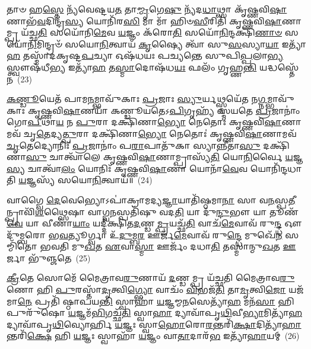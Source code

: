 𑌤𑌾𑍞 𑌹\-\ul{𑌸𑍍𑌤𑍇} 𑌨𑍍𑌯᳴𑌵𑍇𑌷𑍍𑌟𑌯\-\ul{𑌤} 𑌤𑌾\-\ul{𑌮𑍍𑌮𑍃}\-𑌗𑍇\-\ul{𑌷𑍁} 𑌨𑍍𑌯᳴𑌦\-\ul{𑌧𑌾}\-𑌥𑍍𑌸𑌾 𑌕𑍃᳴𑌷𑍍𑌣𑌵𑌿\-\ul{𑌷𑌾}\-𑌣𑌾𑌭᳴\-\ul{𑌵}\-𑌦𑌿𑌨𑍍𑌦𑍍𑌰᳴\-\ul{𑌸𑍍𑌯} 𑌯𑍋𑌨𑌿᳴𑌰\-\ul{𑌸𑌿} 𑌮𑌾 𑌮𑌾᳴ 𑌹𑌿𑍞\-\ul{𑌸𑍀}\-𑌰𑌿𑌤𑌿᳴ 𑌕𑍃𑌷𑍍𑌣𑌵𑌿\-\ul{𑌷𑌾}\-𑌣𑌾𑌮𑍍𑌪𑍍𑌰 𑌯᳴𑌚𑍍𑌛\-\ul{𑌤𑌿} 𑌸𑌯𑍋᳴𑌨𑌿\-\ul{𑌮𑍇}\-𑌵 \ul{𑌯}\-𑌜𑍍𑌞𑌂 𑌕᳴𑌰𑍋\-\ul{𑌤𑌿} 𑌸𑌯𑍋᳴\-\ul{𑌨𑌿}\-𑌨𑍍𑌦𑌕𑍍𑌷𑌿᳴\-\ul{𑌣𑌾}\-\-\ul{𑍞} 𑌸𑌯𑍋᳴\-\ul{𑌨𑌿}\-𑌮𑌿𑌨𑍍𑌦𑍍𑌰𑍞᳴ 𑌸𑌯𑍋\-\ul{𑌨𑌿}\-𑌤𑍍𑌵𑌾𑌯᳴ \ul{𑌕𑍃}\-𑌷𑍍𑌯𑍈 𑌤𑍍𑌵𑌾᳴ 𑌸𑍁\-\ul{𑌸}\-𑌸𑍍𑌯𑌾\-\ul{𑌯𑌾} 𑌇𑌤𑍍𑌯𑌾᳴\-\ul{𑌹} 𑌤𑌸𑍍𑌮𑌾᳴𑌦𑌕𑍃𑌷𑍍𑌟\-\ul{𑌪}\-𑌚𑍍𑌯𑌾 𑌓𑌷᳴𑌧𑌯𑌃 𑌪𑌚𑍍𑌯𑌨𑍍𑌤𑍇 𑌸𑍁𑌪𑌿\-\ul{𑌪𑍍𑌪}\-𑌲𑌾\-\ul{𑌭𑍍𑌯}\-𑌸𑍍𑌤𑍍𑌵𑍗𑌷᳴𑌧𑍀\-\ul{𑌭𑍍𑌯} 𑌇𑌤𑍍𑌯𑌾᳴\-\ul{𑌹} 𑌤\-\ul{𑌸𑍍𑌮𑌾}\-𑌦𑍋𑌷᳴𑌧\-\ul{𑌯𑌃} 𑌫𑌲𑌂᳴ 𑌗𑍃𑌹𑍍𑌣\-\ul{𑌨𑍍𑌤𑌿} 𑌯𑌦𑍍𑌧𑌸𑍍𑌤𑍇᳴𑌨~(23)

\-\ul{𑌕}\-\-\ul{𑌣𑍍𑌡𑍂}\-𑌯𑍇𑌤᳴ 𑌪𑌾𑌮\-\ul{𑌨}\-𑌮𑍍𑌭𑌾𑌵𑍁᳴𑌕𑌾𑌃 \ul{𑌪𑍍𑌰}\-𑌜𑌾𑌃 \ul{𑌸𑍍𑌯𑍁}\-𑌰𑍍𑌯𑌥𑍍𑌸𑍍𑌮𑌯𑍇᳴𑌤 𑌨\-\ul{𑌗𑍍𑌨}\-𑌮𑍍𑌭𑌾𑌵𑍁᳴𑌕𑌾𑌃 𑌕𑍃𑌷𑍍𑌣𑌵𑌿\-\ul{𑌷𑌾}\-𑌣𑌯𑌾᳴ 𑌕𑌣𑍍𑌡𑍂𑌯𑌤𑍇\-𑌽\-\ul{𑌪𑌿}\-𑌗𑍃𑌹𑍍𑌯᳴ 𑌸𑍍𑌮𑌯𑌤𑍇 \ul{𑌪𑍍𑌰}\-𑌜𑌾𑌨𑌾𑌂॑ 𑌗𑍋\-\ul{𑌪𑍀}\-𑌥𑌾\-\ul{𑌯} 𑌨 \ul{𑌪𑍁}\-𑌰𑌾 𑌦𑌕𑍍𑌷𑌿᳴𑌣𑌾\-\ul{𑌭𑍍𑌯𑍋} 𑌨𑍇𑌤𑍋𑌃॑ 𑌕𑍃𑌷𑍍𑌣𑌵𑌿\-\ul{𑌷𑌾}\-𑌣𑌾𑌮𑌵᳴ 𑌚𑍃\-\ul{𑌤𑍇}\-𑌦𑍍𑌯\-\ul{𑌤𑍍𑌪𑍁}\-𑌰𑌾 𑌦𑌕𑍍𑌷𑌿᳴𑌣𑌾\-\ul{𑌭𑍍𑌯𑍋} 𑌨𑍇𑌤𑍋𑌃॑ 𑌕𑍃𑌷𑍍𑌣𑌵𑌿\-\ul{𑌷𑌾}\-𑌣𑌾𑌮𑌵᳴\-\ul{𑌚𑍃}\-𑌤𑍇𑌦𑍍𑌯𑍋𑌨𑌿𑌃᳴ \ul{𑌪𑍍𑌰}\-𑌜𑌾𑌨𑌾𑌂॑ 𑌪\-\ul{𑌰𑌾}\-𑌪𑌾𑌤𑍁᳴𑌕𑌾 𑌸𑍍𑌯𑌾\-\ul{𑌨𑍍𑌨𑍀}\-𑌤𑌾\-\ul{𑌸𑍁} 𑌦𑌕𑍍𑌷𑌿᳴𑌣𑌾\-\ul{𑌸𑍁} 𑌚𑌾𑌤𑍍𑌵𑌾᳴𑌲𑍇 𑌕𑍃𑌷𑍍𑌣𑌵𑌿\-\ul{𑌷𑌾}\-𑌣𑌾𑌮𑍍𑌪𑍍𑌰𑌾𑌸𑍍𑌯᳴\-\ul{𑌤𑌿} 𑌯𑍋\-\ul{𑌨𑌿}\-𑌰𑍍𑌵𑍈 \ul{𑌯}\-𑌜𑍍𑌞\-\ul{𑌸𑍍𑌯} 𑌚𑌾𑌤𑍍𑌵𑌾᳴\-\ul{𑌲𑌂} 𑌯𑍋𑌨𑌿𑌃᳴ 𑌕𑍃𑌷𑍍𑌣𑌵𑌿\-\ul{𑌷𑌾}\-𑌣𑌾 𑌯𑍋𑌨𑌾᳴\-\ul{𑌵𑍇}\-𑌵 𑌯𑍋𑌨𑌿᳴𑌨𑍍𑌦𑌧𑌾𑌤𑌿 \ul{𑌯}\-𑌜𑍍𑌞𑌸𑍍𑌯᳴ 𑌸𑌯𑍋\-\ul{𑌨𑌿}\-𑌤𑍍𑌵𑌾𑌯᳴॥~(24)

{\anuvakamend[{\-\ul{𑌰𑍁}\-\-\ul{𑌨𑍍𑌧} \ul{𑌏}\-𑌷 𑌤𑌸𑍍𑌮𑌾॑𑌚𑍍𑌛\-\ul{𑌰}\-𑌮\-\ul{𑌯𑍀} 𑌯𑍂\-\ul{𑌪}\-𑌸𑍍𑌤𑍃𑌤𑍀᳴𑌯𑌮𑍍𑌮𑌿𑌥𑍁\-\ul{𑌨}\-𑌤𑍍𑌵𑌾\-\ul{𑌯} 𑌜\-\ul{𑌨𑍍𑌮} 𑌹𑌸𑍍𑌤𑍇᳴\-\ul{𑌨𑌾}\-𑌷𑍍𑌟𑌾𑌚᳴𑌤𑍍𑌵𑌾𑌰𑌿𑍞𑌶𑌚𑍍𑌚}]}%

𑌵𑌾𑌗𑍍𑌵𑍈 \ul{𑌦𑍇}\-𑌵𑍇𑌭𑍍𑌯𑍋\-𑌽𑌪𑌾॑𑌕𑍍𑌰𑌾𑌮𑌦𑍍𑌯\-\ul{𑌜𑍍𑌞𑌾}\-𑌯𑌾𑌤𑌿᳴𑌷𑍍𑌠𑌮𑌾\-\ul{𑌨𑌾} 𑌸𑌾 𑌵\-\ul{𑌨}\-𑌸𑍍𑌪\-\ul{𑌤𑍀}\-𑌨𑍍𑌪𑍍𑌰𑌾𑌵𑌿᳴\-\ul{𑌶}\-𑌥𑍍𑌸𑍈𑌷𑌾 𑌵𑌾𑌗𑍍𑌵\-\ul{𑌨}\-𑌸𑍍𑌪𑌤𑌿᳴𑌷𑍁 𑌵𑌦\-\ul{𑌤𑌿} 𑌯𑌾 𑌦𑍁᳴\-\ul{𑌨𑍍𑌦𑍁}\-𑌭𑍗 𑌯𑌾 𑌤𑍂𑌣᳴\-\ul{𑌵𑍇} 𑌯𑌾 𑌵𑍀𑌣𑌾᳴\-\ul{𑌯𑌾𑌂} 𑌯𑌦𑍍𑌦𑍀॑𑌕𑍍𑌷𑌿𑌤\-\ul{𑌦}\-𑌣𑍍𑌡\-\ul{𑌮𑍍𑌪𑍍𑌰}\-𑌯𑌚𑍍𑌛᳴\-\ul{𑌤𑌿} 𑌵𑌾𑌚᳴\-\ul{𑌮𑍇}\-𑌵𑌾𑌵᳴ 𑌰𑍁\-\ul{𑌨𑍍𑌦𑍍𑌧} 𑌔𑌦𑍁᳴𑌮𑍍𑌬𑌰𑍋 𑌭\-\ul{𑌵}\-𑌤𑍍𑌯𑍂𑌰𑍍𑌗𑍍𑌵𑌾 𑌉᳴\-\ul{𑌦𑍁}\-𑌮𑍍𑌬\-\ul{𑌰} 𑌊𑌰𑍍𑌜᳴\-\ul{𑌮𑍇}\-𑌵𑌾𑌵᳴ 𑌰𑍁\-\ul{𑌨𑍍𑌦𑍍𑌧𑍇} 𑌮𑍁𑌖𑍇᳴\-\ul{𑌨} 𑌸𑌮𑍍𑌮𑌿᳴𑌤𑍋 𑌭𑌵𑌤𑌿 𑌮𑍁\-\ul{𑌖}\-𑌤 \ul{𑌏}\-𑌵𑌾\-\ul{𑌸𑍍𑌮𑌾} 𑌊𑌰𑍍𑌜𑌂᳴ 𑌦𑌧𑌾\-\ul{𑌤𑌿} 𑌤𑌸𑍍𑌮𑌾॑𑌨𑍍𑌮𑍁\-\ul{𑌖}\-𑌤 \ul{𑌊}\-𑌰𑍍𑌜𑌾 𑌭𑍁᳴𑌞𑍍𑌜𑌤𑍇~(25)

\-\ul{𑌕𑍍𑌰𑍀}\-𑌤𑍇 𑌸𑍋𑌮𑍇᳴ 𑌮𑍈𑌤𑍍𑌰𑌾𑌵\-\ul{𑌰𑍁}\-𑌣𑌾𑌯᳴ \ul{𑌦}\-𑌣𑍍𑌡𑌮𑍍𑌪𑍍𑌰 𑌯᳴𑌚𑍍𑌛𑌤𑌿 𑌮𑍈𑌤𑍍𑌰𑌾𑌵\-\ul{𑌰𑍁}\-𑌣𑍋 𑌹𑌿 \ul{𑌪𑍁}\-𑌰𑌸𑍍𑌤𑌾᳴\-\ul{𑌦𑍃}\-𑌤𑍍𑌵𑌿\-\ul{𑌗𑍍𑌭𑍍𑌯𑍋} 𑌵𑌾𑌚𑌂᳴ \ul{𑌵𑌿}\-𑌭𑌜᳴\-\ul{𑌤𑌿} 𑌤𑌾\-\ul{𑌮𑍃}\-𑌤𑍍𑌵𑌿\-\ul{𑌜𑍋} 𑌯𑌜᳴𑌮𑌾\-\ul{𑌨𑍇} 𑌪𑍍𑌰𑌤𑌿᳴ 𑌷𑍍𑌠𑌾𑌪𑌯\-\ul{𑌨𑍍𑌤𑌿} 𑌸𑍍𑌵𑌾𑌹𑌾᳴ \ul{𑌯}\-𑌜𑍍𑌞𑌮𑍍𑌮\-\ul{𑌨}\-𑌸𑍇𑌤𑍍𑌯𑌾᳴\-\ul{𑌹} 𑌮𑌨᳴\-\ul{𑌸𑌾} 𑌹𑌿 𑌪𑍁𑌰𑍁᳴𑌷𑍋 \ul{𑌯}\-𑌜𑍍𑌞𑌮᳴\-\ul{𑌭𑌿}\-𑌗𑌚𑍍𑌛᳴\-\ul{𑌤𑌿} 𑌸𑍍𑌵𑌾\-\ul{𑌹𑌾} 𑌦𑍍𑌯𑌾𑌵𑌾᳴𑌪𑍃\-\ul{𑌥𑌿}\-𑌵𑍀\-\ul{𑌭𑍍𑌯𑌾}\-𑌮𑌿𑌤𑍍𑌯𑌾᳴\-\ul{𑌹} 𑌦𑍍𑌯𑌾𑌵𑌾᳴𑌪𑍃\-\ul{𑌥𑌿}\-𑌵𑍍𑌯𑍋𑌰𑍍\mbox{}𑌹𑌿 \ul{𑌯}\-𑌜𑍍𑌞𑌃 𑌸𑍍𑌵𑌾\-\ul{𑌹𑍋}\-𑌰𑍋\-\ul{𑌰}\-𑌨𑍍𑌤𑌰𑌿᳴\-\ul{𑌕𑍍𑌷𑌾}\-𑌦𑌿𑌤𑍍𑌯𑌾᳴\-\ul{𑌹𑌾}\-𑌨𑍍𑌤𑌰𑌿᳴\-\ul{𑌕𑍍𑌷𑍇} 𑌹𑌿 \ul{𑌯}\-𑌜𑍍𑌞𑌃 𑌸𑍍𑌵𑌾𑌹𑌾᳴ \ul{𑌯}\-𑌜𑍍𑌞𑌂 𑌵𑌾\-\ul{𑌤𑌾}\-𑌦𑌾𑌰᳴\-\ul{𑌭} 𑌇𑌤𑍍𑌯𑌾᳴\-\ul{𑌹𑌾}\-𑌯𑌮𑍍~(26)

